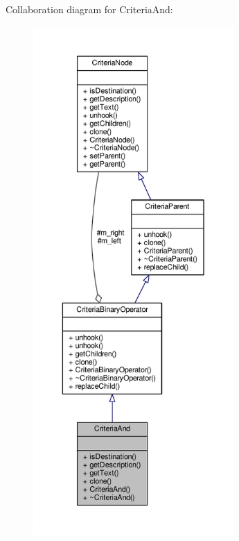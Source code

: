 Collaboration diagram for Criteria\+And\+:
\nopagebreak
\begin{figure}[H]
\begin{center}
\leavevmode
\includegraphics[height=550pt]{db/df6/classCriteriaAnd__coll__graph}
\end{center}
\end{figure}
